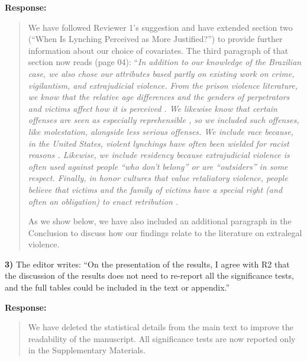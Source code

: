 \documentclass[a4paper,12pt]{article}
\begin{document}
\vspace{.3cm}

\noindent \textbf{Response:} 
\begin{quote}

We have followed Reviewer 1's suggestion and have extended section two (``When
Is Lynching Perceived as More Justified?'') to provide further information
about our choice of covariates. The third paragraph of that section now reads
(page 04): ``\textit{In addition to our knowledge of the Brazilian case, we
  also chose our attributes based partly on existing work on crime,
  vigilantism, and extrajudicial violence. From the prison violence literature,
  we know that the relative age differences and the genders of perpetrators and
  victims affect how it is perceived \citep{fleisher2009myth}. We likewise know
  that certain offenses are seen as especially reprehensible
  \citep{skarbek2014social}, so we included such offenses, like molestation,
  alongside less serious offenses. We include race because, in the United
  States, violent lynchings have often been wielded for racist reasons
  \citep{dray2003hands}. Likewise, we include residency because extrajudicial
  violence is often used against people ``who don't belong'' or are
  ``outsiders'' in some respect. Finally, in honor cultures that value
  retaliatory violence, people believe that victims and the family of victims
  have a special right (and often an obligation) to enact retribution
\citep{weiner2013rule}.}

As we show below, we have also included an additional paragraph in the
Conclusion to discuss how our findings relate to the literature on extralegal
violence.

\end{quote}

\vspace{.3cm}

\noindent \textbf{3)} The editor writes: ``On the presentation of the results,
I agree with R2 that the discussion of the results does not need to re-report
all the significance tests, and the full tables could be included in the text
or appendix.''

\vspace{.3cm}

\noindent \textbf{Response:} 
\begin{quote}

We have deleted the statistical details from the main text to improve the
readability of the manuscript. All significance tests are now reported only in
the Supplementary Materials.

\end{quote}
\end{document}
